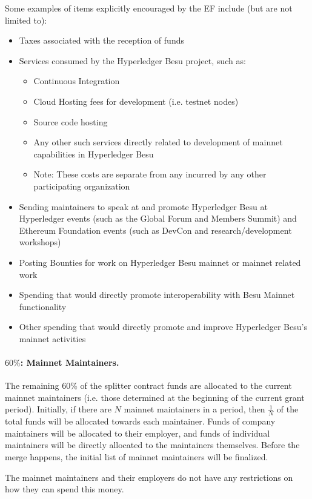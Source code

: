 \medskip
\noindent Some examples of items explicitly encouraged by the EF include (but are not limited to):
\begin{itemize}
\item Taxes associated with the reception of funds
\item Services consumed by the Hyperledger Besu project, such as:
\begin{itemize}
\item Continuous Integration
\item Cloud Hosting fees for development (i.e. testnet nodes)
\item Source code hosting
\item Any other such services directly related to development of mainnet capabilities in Hyperledger Besu
\item Note: These costs are separate from any incurred by any other participating organization
\end{itemize}
\item Sending maintainers to speak at and promote Hyperledger Besu at Hyperledger events (such as the Global Forum and Members Summit) and Ethereum Foundation events (such as DevCon and research/development workshops)
\item Posting Bounties for work on Hyperledger Besu mainnet or mainnet related work
\item Spending that would directly promote interoperability with Besu Mainnet functionality
\item Other spending that would directly promote and improve Hyperledger Besu’s mainnet activities
\end{itemize}

\paragraph{$60\%$:  \textbf{Mainnet Maintainers}.}  The remaining 60\% of the splitter contract funds are allocated to the current mainnet maintainers (i.e. those determined at the beginning of the current grant period).  Initially, if there are $N$ mainnet maintainers in a period, then $\frac{1}{N}$ of the total funds will be allocated towards each maintainer.  Funds of company maintainers will be allocated to their employer, and funds of individual maintainers will be directly allocated to the maintainers themselves.  Before the merge happens, the initial list of mainnet maintainers will be finalized.  

The mainnet maintainers and their employers do not have any restrictions on how they can spend this money.
